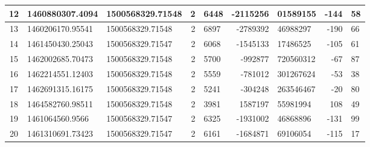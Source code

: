 \begin{table}
\begin{center}
\begin{tabular}{|c|l|l|r@{.}l|r@{.}l|r@{.}l|}
12  &     1460880307.4094    &    1500568329.71548    &      2 & 6448  &      -2115256 & 01589155    &  -144 & 58 \\ \hline
13  &     1460206170.95541   &    1500568329.71548    &      2 & 6897  &      -2789392 & 46988297    &  -190 & 66 \\ \hline
14  &     1461450430.25043   &    1500568329.71547    &      2 & 6068  &      -1545133 & 17486525    &  -105 & 61 \\ \hline
15  &     1462002685.70473   &    1500568329.71548    &      2 & 5700  &       -992877 & 720560312   &   -67 & 87 \\ \hline
16  &     1462214551.12403   &    1500568329.71548    &      2 & 5559  &       -781012 & 301267624   &   -53 & 38 \\ \hline
17  &     1462691315.16175   &    1500568329.71548    &      2 & 5241  &       -304248 & 263546467   &   -20 & 80 \\ \hline
18  &     1464582760.98511   &    1500568329.71548    &      2 & 3981  &       1587197 & 55981994    &   108 & 49 \\ \hline
19  &     1461064560.9566    &    1500568329.71547    &      2 & 6325  &      -1931002 & 46868896    &  -131 & 99 \\ \hline
20  &     1461310691.73423   &    1500568329.71547    &      2 & 6161  &      -1684871 & 69106054    &  -115 & 17 \\ \hline

\end{tabular}
\end{center}
\end{table}
